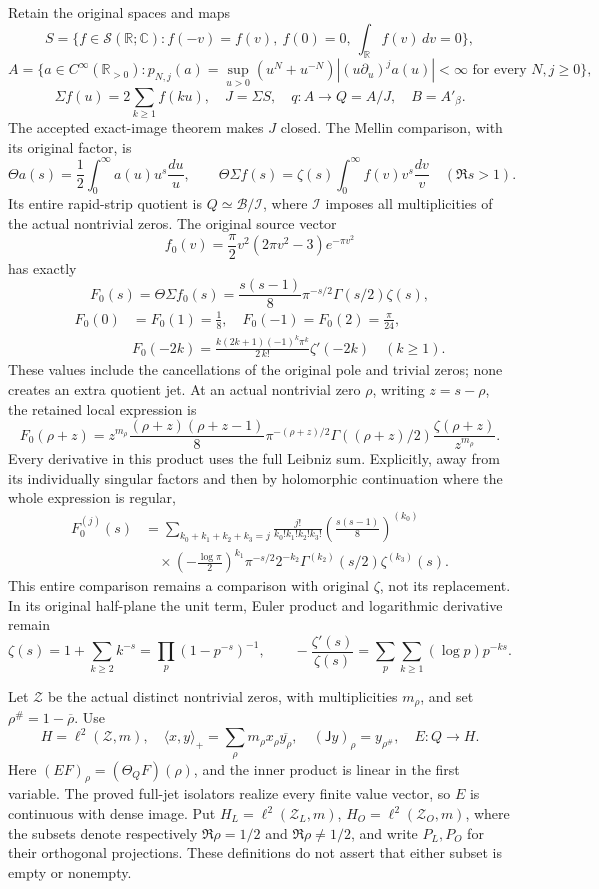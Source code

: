 Retain the original spaces and maps \[
S=\{f\in\mathcal S(\mathbb R;\mathbb C):f(-v)=f(v),\ f(0)=0,
\ \int_{\mathbb R}f(v)\,dv=0\},
\] \[
A=\{a\in C^\infty(\mathbb R_{>0}):
p_{N,j}(a)=\sup_{u>0}(u^N+u^{-N})|(u\partial_u)^ja(u)|<\infty
\text{ for every }N,j\ge0\},
\] \[
\Sigma f(u)=2\sum_{k\ge1}f(ku),\quad J=\Sigma S,
\quad q:A\to Q=A/J,\quad B=A'_\beta.
\tag{AST1.1}
\] The accepted exact-image theorem makes \(J\) closed. The Mellin
comparison, with its original factor, is \[
\Theta a(s)=\frac12\int_0^\infty a(u)u^s\frac{du}{u},\qquad
\Theta\Sigma f(s)=\zeta(s)\int_0^\infty f(v)v^s\frac{dv}{v}
\quad(\Re s>1).
\tag{AST1.2}
\] Its entire rapid-strip quotient is \(Q\simeq\mathcal B/\mathcal I\),
where \(\mathcal I\) imposes all multiplicities of the actual nontrivial
zeros. The original source vector \[
f_0(v)=\frac\pi2v^2(2\pi v^2-3)e^{-\pi v^2}
\] has exactly \[
F_0(s)=\Theta\Sigma f_0(s)
=\frac{s(s-1)}8\pi^{-s/2}\Gamma(s/2)\zeta(s),
\] \[
\begin{aligned}
F_0(0)&=F_0(1)=\frac18,\quad F_0(-1)=F_0(2)=\frac\pi{24},\\&F_0(-2k)=\frac{k(2k+1)(-1)^k\pi^k}{2\,k!}\zeta'(-2k)
\quad(k\ge1).
\end{aligned}
\tag{AST1.3}
\] These values include the cancellations of the original pole and
trivial zeros; none creates an extra quotient jet. At an actual
nontrivial zero \(\rho\), writing \(z=s-\rho\), the retained local
expression is \[
F_0(\rho+z)=z^{m_\rho}
\frac{(\rho+z)(\rho+z-1)}8\pi^{-(\rho+z)/2}
\Gamma((\rho+z)/2)\frac{\zeta(\rho+z)}{z^{m_\rho}}.
\tag{AST1.4}
\] Every derivative in this product uses the full Leibniz sum.
Explicitly, away from its individually singular factors and then by
holomorphic continuation where the whole expression is regular, \[
\begin{aligned}
F_0^{(j)}(s)&=\sum_{k_0+k_1+k_2+k_3=j}
\frac{j!}{k_0!k_1!k_2!k_3!}
\left(\frac{s(s-1)}8\right)^{(k_0)}
\\&\quad{}\times \left(-\frac{\log\pi}{2}\right)^{k_1}\pi^{-s/2}
2^{-k_2}\Gamma^{(k_2)}(s/2)\zeta^{(k_3)}(s).
\end{aligned}
\tag{AST1.5}
\] This entire comparison remains a comparison with original \(\zeta\),
not its replacement. In its original half-plane the unit term, Euler
product and logarithmic derivative remain \[
\zeta(s)=1+\sum_{k\ge2}k^{-s}=\prod_p(1-p^{-s})^{-1},\qquad
-\frac{\zeta'(s)}{\zeta(s)}=\sum_p\sum_{k\ge1}(\log p)p^{-ks}.
\tag{AST1.6}
\]

Let \(\mathscr Z\) be the actual distinct nontrivial zeros, with
multiplicities \(m_\rho\), and set \(\rho^\#=1-\overline\rho\). Use \[
H=\ell^2(\mathscr Z,m),\quad
\langle x,y\rangle_+=\sum_\rho m_\rho x_\rho\overline{y_\rho},
\quad (\mathsf Jy)_\rho=y_{\rho^\#},\quad E:Q\to H.
\tag{AST1.7}
\] Here \((EF)_\rho=(\Theta_QF)(\rho)\), and the inner product is linear
in the first variable. The proved full-jet isolators realize every
finite value vector, so \(E\) is continuous with dense image. Put
\(H_L=\ell^2(\mathscr Z_L,m)\), \(H_O=\ell^2(\mathscr Z_O,m)\), where
the subsets denote respectively \(\Re\rho=1/2\) and \(\Re\rho\ne1/2\),
and write \(P_L,P_O\) for their orthogonal projections. These
definitions do not assert that either subset is empty or nonempty.

